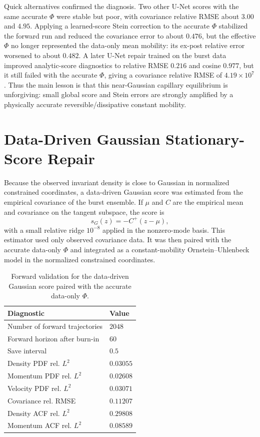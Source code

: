 \documentclass[11pt]{article}
\begin{document}
Quick alternatives confirmed the diagnosis.  Two other U-Net scores with the same accurate \(\Phi\) were stable but poor, with covariance relative RMSE about \(3.00\) and \(4.95\).  Applying a learned-score Stein correction to the accurate \(\Phi\) stabilized the forward run and reduced the covariance error to about \(0.476\), but the effective \(\Phi\) no longer represented the data-only mean mobility: its ex-post relative error worsened to about \(0.482\).  A later U-Net repair trained on the burst data improved analytic-score diagnostics to relative RMSE \(0.216\) and cosine \(0.977\), but it still failed with the accurate \(\Phi\), giving a covariance relative RMSE of \(4.19\times10^7\).  Thus the main lesson is that this near-Gaussian capillary equilibrium is unforgiving: small global score and Stein errors are strongly amplified by a physically accurate reversible/dissipative constant mobility.

\section{Data-Driven Gaussian Stationary-Score Repair}

Because the observed invariant density is close to Gaussian in normalized constrained coordinates, a data-driven Gaussian score was estimated from the empirical covariance of the burst ensemble.  If \(\mu\) and \(C\) are the empirical mean and covariance on the tangent subspace, the score is
\begin{equation}
    s_G(z)=-C^{+}(z-\mu),
\end{equation}
with a small relative ridge \(10^{-8}\) applied in the nonzero-mode basis.  This estimator used only observed covariance data.  It was then paired with the accurate data-only \(\Phi\) and integrated as a constant-mobility Ornstein--Uhlenbeck model in the normalized constrained coordinates.

\begin{table}[tbp]
\centering
\caption{Forward validation for the data-driven Gaussian score paired with the accurate data-only \(\Phi\).}
\label{tab:gaussian_forward}
\begin{tabular}{ll}
\toprule
Diagnostic & Value \\
\midrule
Number of forward trajectories & \(2048\) \\
Forward horizon after burn-in & \(60\) \\
Save interval & \(0.5\) \\
Density PDF rel. \(L^2\) & \(0.03055\) \\
Momentum PDF rel. \(L^2\) & \(0.02608\) \\
Velocity PDF rel. \(L^2\) & \(0.03071\) \\
Covariance rel. RMSE & \(0.11207\) \\
Density ACF rel. \(L^2\) & \(0.29808\) \\
Momentum ACF rel. \(L^2\) & \(0.08589\) \\
\bottomrule
\end{tabular}
\end{table}
\end{document}
